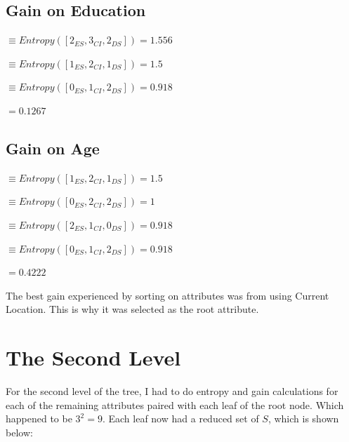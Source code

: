 \documentclass[8pt]{article}
\begin{document}
    \subsection{Gain on Education}

      \begin{description}
        \setlength{\itemsep}{1pt}
        \setlength{\parskip}{0pt}
        \setlength{\parsep}{0pt}
        \item[$Entropy(S_{University})$] $\equiv Entropy([2_{ES},3_{CI},2_{DS}]) = 1.556$
        \item[$Entropy(S_{School})$] $\equiv Entropy([1_{ES},2_{CI},1_{DS}]) = 1.5$
        \item[$Entropy(S_{None})$] $\equiv Entropy([0_{ES},1_{CI},2_{DS}]) = 0.918$
        \item[$Gain(S,Edu)$] $= 0.1267$
      \end{description}

    \subsection{Gain on Age}

      \begin{description}
        \setlength{\itemsep}{1pt}
        \setlength{\parskip}{0pt}
        \setlength{\parsep}{0pt}
        \item[$Entropy(S_{18})$] $\equiv Entropy([1_{ES},2_{CI},1_{DS}]) = 1.5$
        \item[$Entropy(S_{19})$] $\equiv Entropy([0_{ES},2_{CI},2_{DS}]) = 1$
        \item[$Entropy(S_{20})$] $\equiv Entropy([2_{ES},1_{CI},0_{DS}]) = 0.918$
        \item[$Entropy(S_{21})$] $\equiv Entropy([0_{ES},1_{CI},2_{DS}]) = 0.918$
        \item[$Gain(S,Age)$] $= 0.4222$
      \end{description}

    The best gain experienced by sorting on attributes was from using Current Location. This is why it was selected
    as the root attribute.


  \section{The Second Level}
    For the second level of the tree, I had to do entropy and gain calculations for each of the remaining attributes
    paired with each leaf of the root node. Which happened to be $3^2 = 9$. Each leaf now had a reduced set of $S$, which
    is shown below:
\end{document}
